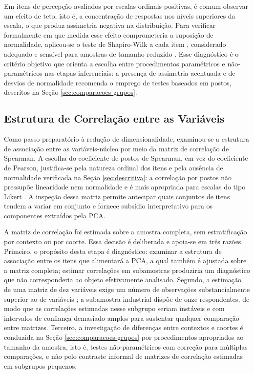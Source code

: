 Em itens de percepção avaliados por escalas ordinais positivas, é comum observar um efeito de teto, isto é, a concentração de respostas nos níveis superiores da escala, o que produz assimetria negativa na distribuição. Para verificar formalmente em que medida esse efeito comprometeria a suposição de normalidade, aplicou-se o teste de Shapiro-Wilk a cada item \cite{shapirowilk1965}, considerado adequado e sensível para amostras de tamanho reduzido \cite{field2018}. Esse diagnóstico é o critério objetivo que orienta a escolha entre procedimentos paramétricos e não-paramétricos nas etapas inferenciais: a presença de assimetria acentuada e de desvios de normalidade recomenda o emprego de testes baseados em postos, descritos na Seção \ref{sec:comparacoes-grupos}.

\subsection{Estrutura de Correlação entre as Variáveis}
\label{sec:correlacao}

Como passo preparatório à redução de dimensionalidade, examinou-se a estrutura de associação entre as variáveis-núcleo por meio da matriz de correlação de Spearman. A escolha do coeficiente de postos de Spearman, em vez do coeficiente de Pearson, justifica-se pela natureza ordinal dos itens e pela ausência de normalidade verificada na Seção \ref{sec:descritiva}: a correlação por postos não pressupõe linearidade nem normalidade e é mais apropriada para escalas do tipo Likert \cite{field2018}. A inspeção dessa matriz permite antecipar quais conjuntos de itens tendem a variar em conjunto e fornece subsídio interpretativo para os componentes extraídos pela PCA.

A matriz de correlação foi estimada sobre a amostra completa, sem estratificação por contexto ou por coorte. Essa decisão é deliberada e apoia-se em três razões. Primeiro, o propósito desta etapa é diagnóstico: examinar a estrutura de associação entre os itens que alimentará a PCA, a qual também é ajustada sobre a matriz completa; estimar correlações em subamostras produziria um diagnóstico que não corresponderia ao objeto efetivamente analisado. Segundo, a estimação de uma matriz de dez variáveis exige um número de observações substancialmente superior ao de variáveis \cite{hair2019}; a subamostra industrial dispõe de onze respondentes, de modo que as correlações estimadas nesse subgrupo seriam instáveis e com intervalos de confiança demasiado amplos para sustentar qualquer comparação entre matrizes. Terceiro, a investigação de diferenças entre contextos e coortes é conduzida na Seção \ref{sec:comparacoes-grupos} por procedimentos apropriados ao tamanho da amostra, isto é, testes não-paramétricos com correção para múltiplas comparações, e não pelo contraste informal de matrizes de correlação estimadas em subgrupos pequenos.

